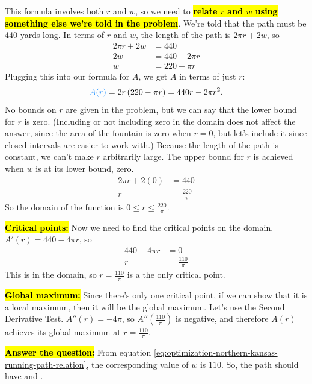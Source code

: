 \documentclass{article}
\newcommand{\highlight}[1]{\boldmath\hl{\textbf{#1}}\unboldmath}
\newcommand{\goal}[1]{\textbf{\textcolor{skyblue}{#1}}}
\begin{document}
\begin{enumerate}[resume]
\begin{solution}
    This formula involves both $r$ and $w$, so we need to \highlight{relate $r$ and $w$ using something else we're told in the problem}. We're told that the path must be 440 yards long. In terms of $r$ and $w$, the length of the path is $2 \pi r + 2w$, so
    \begin{align}
      2 \pi r + 2w &= 440 \nonumber \\
      2w &= 440 - 2 \pi r \nonumber \\
      w &= 220 - \pi r \label{eq:optimization-northern-kansas-running-path-relation}
    \end{align}
    Plugging this into our formula for $A$, we get $A$ in terms of just
    $r$:
    \[ \goal{$A(r)$} = 2r \left( 220 - \pi r \right) = 440r-2\pi r^2.\]
    No bounds on $r$ are given in the problem, but we can say that the lower bound
    for $r$ is zero. (Including or not including zero in the domain does not affect
    the answer, since
    the area of the fountain is zero when $r=0$, but let's include it since closed intervals
    are easier to work with.) Because the length of the path is constant, we can't
    make $r$ arbitrarily large. The upper bound for $r$ is achieved when $w$ is at
    its lower bound, zero.
    \begin{align*}
      2\pi r + 2(0) &= 440 \\
      r &= \frac{220}{\pi}
    \end{align*}
    So the domain of the function is $0 \leq r \leq \frac{220}{\pi}$.
    
    \highlight{Critical points:} Now we need to find the critical points on the
    domain. $A'(r)=440-4\pi r$, so
    \begin{align*}
      440 - 4\pi r &= 0 \\
      r &= \frac{110}{\pi}
    \end{align*}
    This is in the domain, so $r=\frac{110}{\pi}$ is a the only critical point.

    \highlight{Global maximum:} Since there's only one critical point, if we can show
    that it is a local maximum, then it will be the global maximum. Let's use the Second
    Derivative Test. $A''(r) = -4\pi$, so $A''(\frac{110}{\pi})$ is negative, 
    and therefore $A(r)$ achieves its global maximum at $r=\frac{110}{\pi}$. 

    \highlight{Answer the question:} From equation \eqref{eq:optimization-northern-kansas-running-path-relation}, the corresponding value of $w$ is $110$. So, the path should have  and .
  \end{solution}

\end{enumerate}
\end{document}
